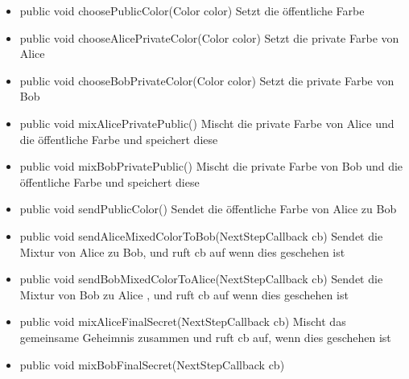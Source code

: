 \documentclass{article}
\begin{document}
\begin{itemize}
           \item public void choosePublicColor(Color color) \newline
               Setzt die öffentliche Farbe\newline
           \item public void chooseAlicePrivateColor(Color color) \newline
               Setzt die private Farbe von Alice\newline
           \item public void chooseBobPrivateColor(Color color) \newline
               Setzt die private Farbe von Bob\newline
           \item public void mixAlicePrivatePublic() \newline
               Mischt die private Farbe von Alice und die öffentliche Farbe\newline
               und speichert diese\newline
           \item public void mixBobPrivatePublic() \newline
               Mischt die private Farbe von Bob und die öffentliche Farbe\newline
               und speichert diese\newline
           \item public void sendPublicColor() \newline
               Sendet die öffentliche Farbe von Alice zu Bob\newline
           \item public void sendAliceMixedColorToBob(NextStepCallback cb) \newline
               Sendet die Mixtur von Alice zu Bob, und ruft cb auf wenn dies geschehen ist\newline
           \item public void sendBobMixedColorToAlice(NextStepCallback cb) \newline
               Sendet die Mixtur von Bob zu Alice , und ruft cb auf wenn dies geschehen ist\newline
           \item public void mixAliceFinalSecret(NextStepCallback cb) \newline
               Mischt das gemeinsame Geheimnis zusammen und ruft cb auf, wenn dies geschehen ist\newline
           \item public void mixBobFinalSecret(NextStepCallback cb) \newline

\end{itemize}
\end{document}
